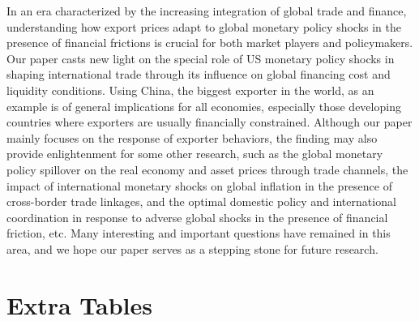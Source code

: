 In an era characterized by the increasing integration of global trade and finance, understanding how export prices adapt to global monetary policy shocks in the presence of financial frictions is crucial for both market players and policymakers. Our paper casts new light on the special role of US monetary policy shocks in shaping international trade through its influence on global financing cost and liquidity conditions. Using China, the biggest exporter in the world, as an example is of general implications for all economies, especially those developing countries where exporters are usually financially constrained. Although our paper mainly focuses on the response of exporter behaviors, the finding may also provide enlightenment for some other research, such as the global monetary policy spillover on the real economy and asset prices through trade channels, the impact of international monetary shocks on global inflation in the presence of cross-border trade linkages, and the optimal domestic policy and international coordination in response to adverse global shocks in the presence of financial friction, etc. Many interesting and important questions have remained in this area, and we hope our paper serves as a stepping stone for future research.


\newpage


\newpage
\appendix

\section{Extra Tables}\label{Appendix-Tables}

\setcounter{table}{0}

\renewcommand{\thetable}{A\arabic{table}}

